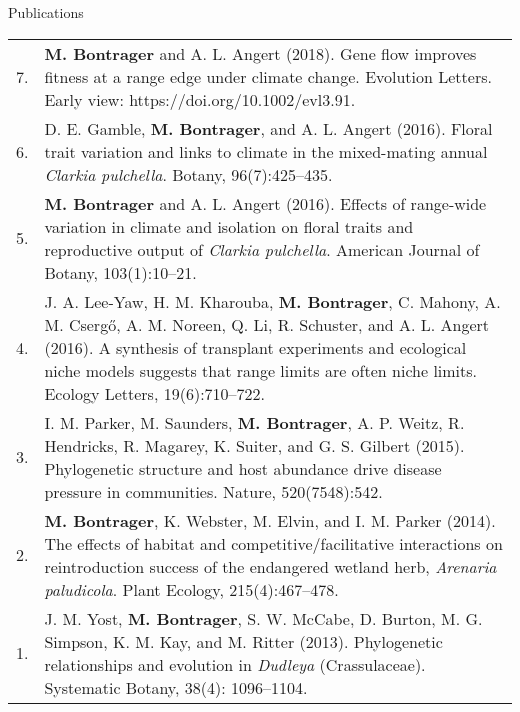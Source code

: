 \documentclass[letterpaper,11pt,oneside]{article}
\newcommand\hangbibentry[1]{%
    \smallskip\par\hangpara{1em}{1}\bibentry{#1}\smallskip\par 
}
\begin{document}
\newpage


\noindent\Large{Publications}  
\normalsize
\bigskip

\bgroup
\def\arraystretch{1.2}
\noindent \begin{tabular}{@{} p{1cm} >{\raggedright\arraybackslash}p{15.11cm}}
7. & \textbf{M. Bontrager} and A. L. Angert (2018). Gene flow improves fitness at a range edge under climate change. Evolution Letters. Early view: https://doi.org/10.1002/evl3.91. \\
6. & D. E. Gamble, \textbf{M. Bontrager}, and A. L. Angert (2016). Floral trait variation and links to climate in the mixed-mating annual \textit{Clarkia pulchella}. Botany, 96(7):425–435. \\
5. & \textbf{M. Bontrager} and A. L. Angert (2016). Effects of range-wide variation in climate and isolation on floral traits and reproductive output of \textit{Clarkia pulchella}. American Journal of Botany, 103(1):10–21.  \\
4. & J. A. Lee-Yaw, H. M. Kharouba, \textbf{M. Bontrager}, C. Mahony, A. M. Cserg{\H{o}}, A. M. Noreen, Q. Li, R. Schuster, and A. L. Angert (2016). A synthesis of transplant experiments and ecological niche models suggests that range limits are often niche limits. Ecology Letters, 19(6):710–722. \\
3. & I. M. Parker, M. Saunders, \textbf{M. Bontrager}, A. P. Weitz, R. Hendricks, R. Magarey, K. Suiter, and G. S. Gilbert (2015). Phylogenetic structure and host abundance drive disease pressure in communities. Nature, 520(7548):542. \\
2. & \textbf{M. Bontrager}, K. Webster, M. Elvin, and I. M. Parker (2014). The effects of habitat and competitive/facilitative interactions on reintroduction success of the endangered wetland herb, \textit{Arenaria paludicola}. Plant Ecology, 215(4):467–478. \\
1. & J. M. Yost, \textbf{M. Bontrager}, S. W. McCabe, D. Burton, M. G. Simpson, K. M. Kay, and M. Ritter (2013). Phylogenetic relationships and evolution in \textit{Dudleya} (Crassulaceae). Systematic Botany, 38(4): 1096–1104. \\
\end{tabular}
\egroup
\bigskip
\bigskip
\end{document}
